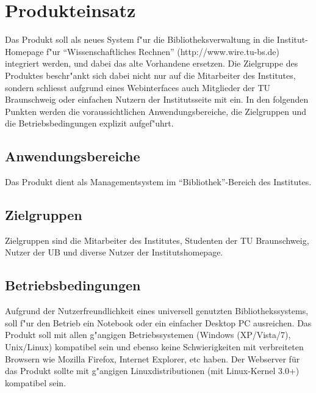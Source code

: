 \chapter{Produkteinsatz}
Das Produkt soll als neues System f"ur die Bibliotheksverwaltung in die Institut-Homepage f"ur "`Wissenschaftliches Rechnen"' (http://www.wire.tu-bs.de) integriert werden, und dabei das alte Vorhandene ersetzen. Die Zielgruppe des Produktes beschr"ankt sich dabei nicht nur auf die Mitarbeiter des Institutes, sondern schliesst aufgrund eines Webinterfaces auch Mitglieder der TU Braunschweig oder einfachen Nutzern der Institutsseite mit ein. 
In den folgenden Punkten werden die voraussichtlichen Anwendungsbereiche, die Zielgruppen und die Betriebsbedingungen explizit aufgef"uhrt. 

\section{Anwendungsbereiche}
Das Produkt dient als Managementsystem im "`Bibliothek"'-Bereich des Institutes.

\section{Zielgruppen}
Zielgruppen sind die Mitarbeiter des Institutes, Studenten der TU Braunschweig, Nutzer der \gls{UB} und diverse Nutzer der Institutshomepage.

\section{Betriebsbedingungen}
Aufgrund der Nutzerfreundlichkeit eines universell genutzten Bibliothekssystems, soll 
f"ur den Betrieb ein Notebook oder ein einfacher Desktop PC ausreichen. Das Produkt soll mit allen g"angigen Betriebssystemen (Windows (XP/Vista/7), Unix/Linux) kompatibel sein und ebenso keine Schwierigkeiten mit verbreiteten Browsern wie Mozilla Firefox, Internet Explorer, etc haben. Der Webserver für das Produkt sollte mit g"angigen Linuxdistributionen (mit Linux-Kernel 3.0+) kompatibel sein. 